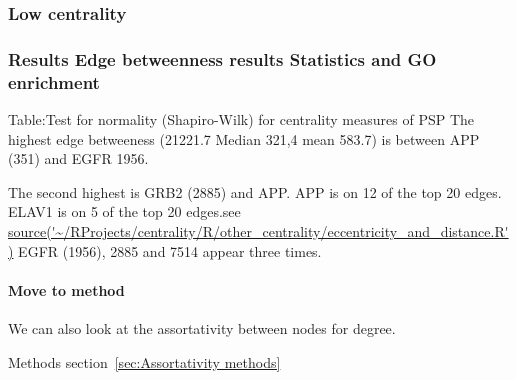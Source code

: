 \subsubsection{Low centrality}



\clearpage





\subsubsection{Results Edge betweenness results Statistics and GO enrichment}Table:Test for normality (Shapiro-Wilk) for centrality measures of PSP
The highest edge betweeness (21221.7 Median 321,4 mean 583.7) is between APP (351) and EGFR 1956.

The second highest is GRB2 (2885) and APP.
APP is on 12 of the top 20 edges. 
ELAV1 is on 5 of the top 20 edges.see \url{source('~/RProjects/centrality/R/other_centrality/eccentricity_and_distance.R')} EGFR (1956), 2885 and 7514 appear three times.



\clearpage

\paragraph{Move to method}
We can also look at the assortativity between nodes for degree.

Methods section~\ref{sec:Assortativity methods}

